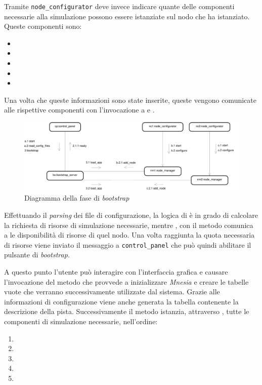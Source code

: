 Tramite \texttt{node\_configurator} deve invece indicare quante delle componenti necessarie alla simulazione possono essere istanziate sul nodo \Erlang{} che ha istanziato. Queste componenti sono:
\begin{itemize}
\item \sched{}
\item \evdisp{}
\item \car{}
\item \team{}
\item \weather{}
\end{itemize}

Una volta che queste informazioni sono state inserite, queste vengono comunicate alle rispettive componenti \Erlang{} con l'invocazione a  e .

\begin{landscape}
\begin{figure}
\includegraphics[height=.24\paperheight]{diagrammi/Bootstrap}
\caption{Diagramma della fase di \textit{bootstrap}}
\label{fig:bootstrap}
\end{figure}
\end{landscape}

Effettuando il \textit{parsing} dei file di configurazione, la logica di  è in grado di calcolare la richiesta di risorse di simulazione necessarie, mentre , con il metodo  comunica a \bootserv{} le disponibilità di risorse di quel nodo. Una volta raggiunta la quota necessaria di risorse viene inviato il messaggio  a \texttt{control\_panel} che può quindi abilitare il pulsante di \textit{bootstrap}.

A questo punto l'utente può interagire con l'interfaccia grafica e causare l'invocazione del metodo  che provvede a inizializzare \textsl{Mnesia} e creare le tabelle vuote che verranno successivamente utilizzate dal sistema. Grazie alle informazioni di configurazione viene anche generata la tabella contenente la descrizione della pista. Successivamente il metodo  istanzia, attraverso , tutte le componenti di simulazione necessarie, nell'ordine:
\begin{enumerate}
\item \evdisp{}
\item \sched{}
\item \weather{}
\item \team{}
\item \car{}
\end{enumerate}

